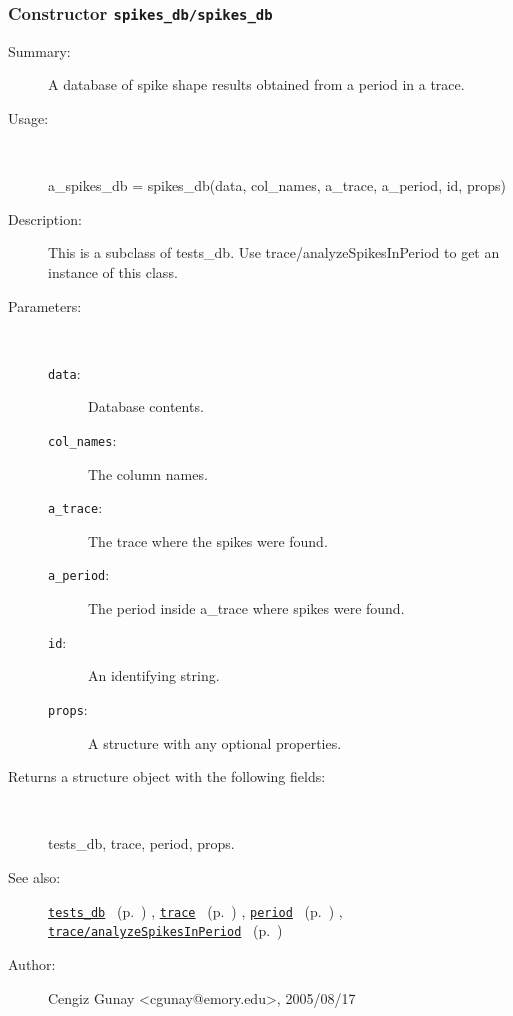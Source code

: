 \subsubsection[Constructor \texttt{spikes\_db}]{Constructor \texttt{spikes\_db/spikes\_db}}%
%
\label{ref_spikes_db__spikes_db}%
\hypertarget{ref_spikes_db__spikes_db}{}%
\begin{description}
\item[Summary:]A database of spike shape results obtained from a period in a trace.
%
\item[Usage:]~%
\begin{lyxcode}%
a\_spikes\_db = spikes\_db(data, col\_names, a\_trace, a\_period, id, props)
%
\end{lyxcode}%
%
\item[Description:]%
This is a subclass of tests\_db. Use trace/analyzeSpikesInPeriod to 
 get an instance of this class.
\item[Parameters:]~
\begin{description}%
\item[\texttt{data}:]
 Database contents.
\item[\texttt{col\_names}:]
 The column names.
\item[\texttt{a\_trace}:]
 The trace where the spikes were found.
\item[\texttt{a\_period}:]
 The period inside a\_trace where spikes were found.
\item[\texttt{id}:]
 An identifying string.
\item[\texttt{props}:]
 A structure with any optional properties.
\end{description}%
%
\item[Returns a structure object with the following fields:]~

	tests\_db, trace, period, props.
%
%
\item[See also:]%
\hyperlink{ref_tests_db}{\texttt{tests\_db}}%
\ (p.~\pageref{ref_tests_db})%
%
, \hyperlink{ref_trace}{\texttt{trace}}%
\ (p.~\pageref{ref_trace})%
%
, \hyperlink{ref_period}{\texttt{period}}%
\ (p.~\pageref{ref_period})%
%
, \hyperlink{ref_trace__analyzeSpikesInPeriod}{\texttt{trace/analyzeSpikesInPeriod}}%
\ (p.~\pageref{ref_trace__analyzeSpikesInPeriod})%
%
%
\item[Author:]%
Cengiz Gunay <cgunay@emory.edu>, 2005/08/17%
\end{description}
\methodline%
